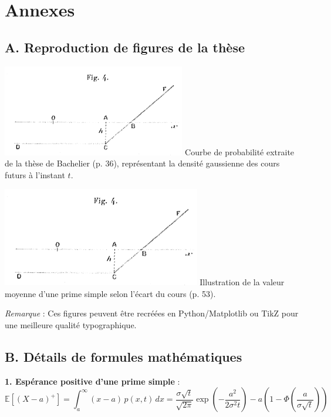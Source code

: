 \documentclass[12pt,a4paper]{article}
\begin{document}
\appendix
\section*{Annexes}

\subsection*{A. Reproduction de figures de la thèse}

\begin{center}
    \includegraphics[width=0.6\textwidth]{fig4.png}
    Courbe de probabilité extraite de la thèse de Bachelier (p. 36), représentant la densité gaussienne des cours futurs à l’instant $t$.
\end{center}

\vspace{0.5cm}

\begin{center}
    \includegraphics[width=0.65\textwidth]{fig4.png}
    Illustration de la valeur moyenne d’une prime simple selon l’écart du cours (p. 53).
\end{center}

\textit{Remarque} : Ces figures peuvent être recréées en Python/Matplotlib ou TikZ pour une meilleure qualité typographique.

\subsection*{B. Détails de formules mathématiques}

\textbf{1. Espérance positive d’une prime simple} :
\[
\mathbb{E}[(X - a)^+] = \int_a^{\infty} (x - a)\, p(x,t)\, dx
= \frac{\sigma\sqrt{t}}{\sqrt{2\pi}} \exp\left(-\frac{a^2}{2\sigma^2 t}\right) - a\left(1 - \Phi\left(\frac{a}{\sigma \sqrt{t}}\right)\right)
\]
\end{document}
